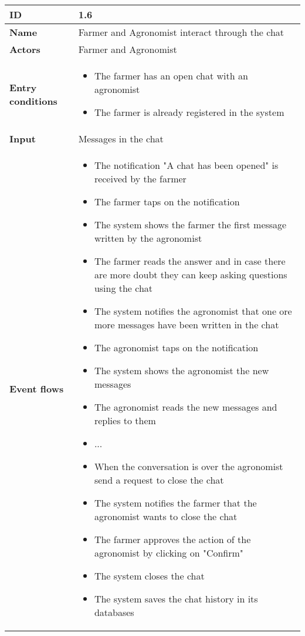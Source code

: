 \begin{longtable}[H]{ | l | p{10cm} | }
\hline
{\cellcolor[rgb]{0.753,0.753,0.753}}\textbf{ID}  & 1.6 \\ \hline
{\cellcolor[rgb]{0.753,0.753,0.753}}\textbf{Name} & Farmer and Agronomist interact through the chat \\ \hline
{\cellcolor[rgb]{0.753,0.753,0.753}}\textbf{Actors} & Farmer and Agronomist \\ \hline
{\cellcolor[rgb]{0.753,0.753,0.753}}\textbf{Entry conditions} &
\begin{itemize}
    \item The farmer has an open chat with an agronomist
    \item The farmer is already registered in the system
\end{itemize}
\\ \hline
{\cellcolor[rgb]{0.753,0.753,0.753}}\textbf{Input} & Messages in the chat\\ \hline
{\cellcolor[rgb]{0.753,0.753,0.753}}\textbf{Event flows} &
\begin{itemize}
    \item The notification "A chat has been opened" is received by the farmer
    \item The farmer taps on the notification
    \item The system shows the farmer the first message written by the agronomist
    \item The farmer reads the answer and in case there are more doubt they can keep asking questions using the chat
    \item The system notifies the agronomist that one ore more messages have been written in the chat
    \item The agronomist taps on the notification
    \item The system shows the agronomist the new messages
    \item The agronomist reads the new messages and replies to them
    \item ...
    \item When the conversation is over the agronomist send a request to close the chat
    \item The system notifies the farmer that the agronomist wants to close the chat
    \item The farmer approves the action of the agronomist by clicking on "Confirm"
    \item The system closes the chat
    \item The system saves the chat history in its databases

\end{itemize}
\end{longtable}
